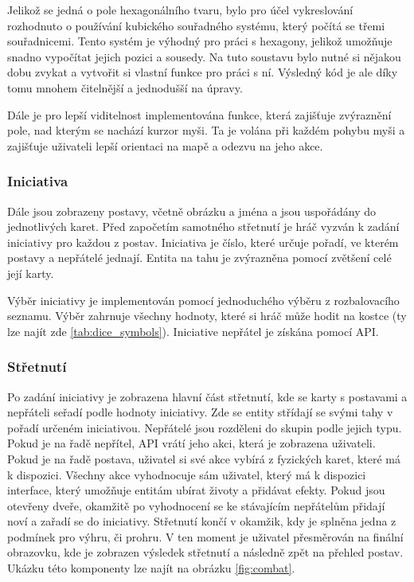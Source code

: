 Jelikož se jedná o pole hexagonálního tvaru, bylo pro účel vykreslování rozhodnuto o používání kubického souřadného systému, který počítá se třemi souřadnicemi. Tento systém je výhodný pro práci s hexagony, jelikož umožňuje snadno vypočítat jejich pozici a sousedy. Na tuto soustavu bylo nutné si nějakou dobu zvykat a vytvořit si vlastní funkce pro práci s ní. Výsledný kód je ale díky tomu mnohem čitelnější a jednodušší na úpravy.

Dále je pro lepší viditelnost implementována funkce, která zajišťuje zvýraznění pole, nad kterým se nachází kurzor myši. Ta je volána při každém pohybu myši a zajišťuje uživateli lepší orientaci na mapě a odezvu na jeho akce.

\subsubsection*{Iniciativa}
Dále jsou zobrazeny postavy, včetně obrázku a jména a jsou uspořádány do jednotlivých karet. Před započetím samotného střetnutí je hráč vyzván k zadání iniciativy pro každou z postav. Iniciativa je číslo, které určuje pořadí, ve kterém postavy a nepřátelé jednají. Entita na tahu je zvýrazněna pomocí zvětšení celé její karty.

Výběr iniciativy je implementován pomocí jednoduchého výběru z rozbalovacího seznamu. Výběr zahrnuje všechny hodnoty, které si hráč může hodit na kostce (ty lze najít zde \ref{tab:dice_symbols}). Iniciative nepřátel je získána pomocí API.

\subsubsection*{Střetnutí}
Po zadání iniciativy je zobrazena hlavní část střetnutí, kde se karty s postavami a nepřáteli seřadí podle hodnoty iniciativy. Zde se entity střídají se svými tahy v pořadí určeném iniciativou. Nepřátelé jsou rozděleni do skupin podle jejich typu. Pokud je na řadě nepřítel, API vrátí jeho akci, která je zobrazena uživateli. Pokud je na řadě postava, uživatel si své akce vybírá z fyzických karet, které má k dispozici. Všechny akce vyhodnocuje sám uživatel, který má k dispozici interface, který umožňuje entitám ubírat životy a přidávat efekty. Pokud jsou otevřeny dveře, okamžitě po vyhodnocení se ke stávajícím nepřátelům přidají noví a zařadí se do iniciativy. Střetnutí končí v okamžik, kdy je splněna jedna z podmínek pro výhru, či prohru. V ten moment je uživatel přesměrován na finální obrazovku, kde je zobrazen výsledek střetnutí a následně zpět na přehled postav. Ukázku této komponenty lze najít na obrázku \ref{fig:combat}.

